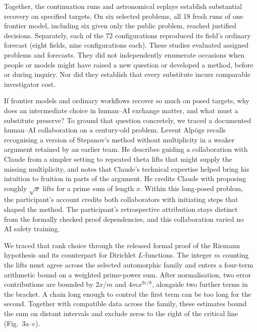 Together, the continuation runs and astronomical replays establish substantial recovery on specified targets. On six selected problems, all 18 fresh runs of one frontier model, including six given only the public problem, reached justified decisions. Separately, each of the 72 configurations reproduced its field's ordinary forecast (eight fields, nine configurations each). These studies evaluated assigned problems and forecasts. They did not independently enumerate occasions when people or models might have raised a new question or developed a method, before or during inquiry. Nor did they establish that every substitute incurs comparable investigator cost.

If frontier models and ordinary workflows recover so much on posed targets, why does an intermediate choice in human--AI exchange matter, and what must a substitute preserve? To ground that question concretely, we traced a documented human--AI collaboration on a century-old problem. Levent Alpöge recalls recognising a version of Stepanov's method without multiplicity in a weaker argument retained by an earlier team.\cite{ALPOGE} He describes guiding a collaboration with Claude from a simpler setting to repeated theta lifts that might supply the missing multiplicity, and notes that Claude's technical expertise helped bring his intuition to fruition in parts of the argument. He credits Claude with proposing roughly \(\sqrt{x}\) lifts for a prime sum of length \(x\). Within this long-posed problem, the participant's account credits both collaborators with initiating steps that shaped the method. The participant's retrospective attribution stays distinct from the formally checked proof dependencies, and this collaboration varied no AI safety training.

We traced that rank choice through the released formal proof of the Riemann hypothesis and its counterpart for Dirichlet \(L\)-functions.\cite{RHSOURCE,SUTHERLAND} The integer \(m\) counting the lifts must agree across the selected automorphic family and enters a four-term arithmetic bound on a weighted prime-power sum. After normalisation, two error contributions are bounded by \(2x/m\) and \(4m x^{9\varepsilon/8}\), alongside two further terms in the bracket. A chain long enough to control the first term can be too long for the second. Together with compatible data across the family, these estimates bound the sum on distant intervals and exclude zeros to the right of the critical line (Fig.~3a--c).

